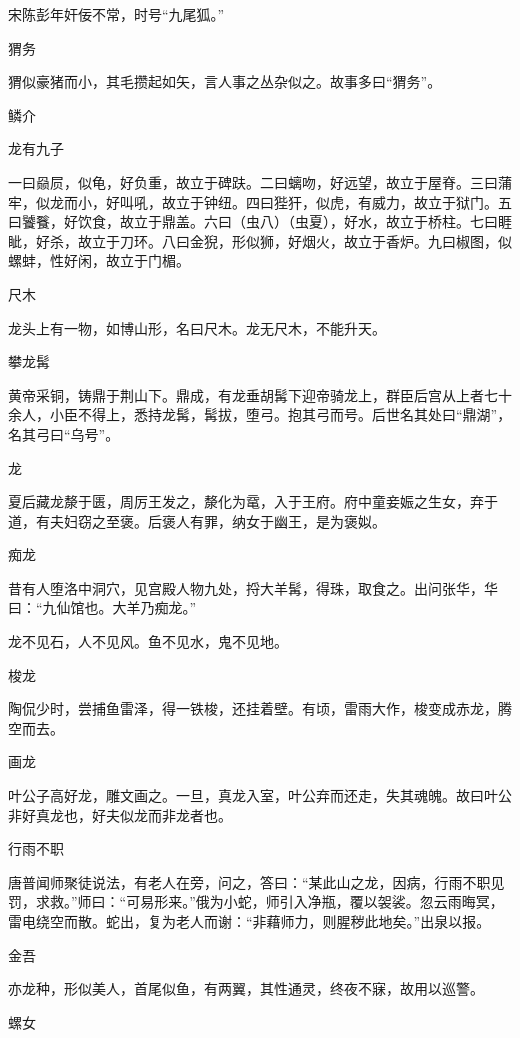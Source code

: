 \documentclass[a4paper,12pt,UTF8,twoside]{ctexbook}
\begin{document}
    宋陈彭年奸佞不常，时号“九尾狐。”
    
    猬务
    
    猬似豪猪而小，其毛攒起如矢，言人事之丛杂似之。故事多曰“猬务”。
    
    鳞介
    
    龙有九子
    
    一曰赑屃，似龟，好负重，故立于碑趺。二曰螭吻，好远望，故立于屋脊。三曰蒲牢，似龙而小，好叫吼，故立于钟纽。四曰狴犴，似虎，有威力，故立于狱门。五曰饕餮，好饮食，故立于鼎盖。六曰（虫八）（虫夏），好水，故立于桥柱。七曰睚眦，好杀，故立于刀环。八曰金猊，形似狮，好烟火，故立于香炉。九曰椒图，似螺蚌，性好闲，故立于门楣。
    
    尺木
    
    龙头上有一物，如博山形，名曰尺木。龙无尺木，不能升天。
    
    攀龙髯
    
    黄帝采铜，铸鼎于荆山下。鼎成，有龙垂胡髯下迎帝骑龙上，群臣后宫从上者七十余人，小臣不得上，悉持龙髯，髯拔，堕弓。抱其弓而号。后世名其处曰“鼎湖”，名其弓曰“乌号”。
    
    龙
    
    夏后藏龙漦于匮，周厉王发之，漦化为鼋，入于王府。府中童妾娠之生女，弃于道，有夫妇窃之至褒。后褒人有罪，纳女于幽王，是为褒姒。
    
    痴龙
    
    昔有人堕洛中洞穴，见宫殿人物九处，捋大羊髯，得珠，取食之。出问张华，华曰：“九仙馆也。大羊乃痴龙。”
    
    龙不见石，人不见风。鱼不见水，鬼不见地。
    
    梭龙
    
    陶侃少时，尝捕鱼雷泽，得一铁梭，还挂着壁。有顷，雷雨大作，梭变成赤龙，腾空而去。
    
    画龙
    
    叶公子高好龙，雕文画之。一旦，真龙入室，叶公弃而还走，失其魂魄。故曰叶公非好真龙也，好夫似龙而非龙者也。
    
    行雨不职
    
    唐普闻师聚徒说法，有老人在旁，问之，答曰：“某此山之龙，因病，行雨不职见罚，求救。”师曰：“可易形来。”俄为小蛇，师引入净瓶，覆以袈裟。忽云雨晦冥，雷电绕空而散。蛇出，复为老人而谢：“非藉师力，则腥秽此地矣。”出泉以报。
    
    金吾
    
    亦龙种，形似美人，首尾似鱼，有两翼，其性通灵，终夜不寐，故用以巡警。
    
    螺女
    
\end{document}
